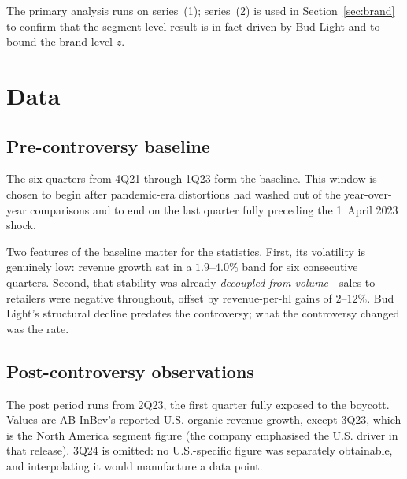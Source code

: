 \documentclass[11pt,a4paper]{article}
\begin{document}
The primary analysis runs on series~(1); series~(2) is used in
Section~\ref{sec:brand} to confirm that the segment-level result is in fact
driven by Bud Light and to bound the brand-level $z$.

\section{Data}

\subsection{Pre-controversy baseline}

The six quarters from 4Q21 through 1Q23 form the baseline. This window is
chosen to begin after pandemic-era distortions had washed out of the
year-over-year comparisons and to end on the last quarter fully preceding the
1~April 2023 shock.

\begin{table}[h]
\centering
\caption{Pre-controversy baseline: AB InBev U.S. quarterly performance. Revenue
growth is remarkably stable---a mean of \baseMu\% with a standard deviation of
only \baseSd\ percentage points---because price and mix were carrying the
business while volumes drifted gently down.}
\vspace{2pt}
\BaselineTable
\end{table}

Two features of the baseline matter for the statistics. First, its volatility
is genuinely low: revenue growth sat in a $1.9$--$4.0\%$ band for six
consecutive quarters. Second, that stability was already \emph{decoupled from
volume}---sales-to-retailers were negative throughout, offset by revenue-per-hl
gains of $2$--$12\%$. Bud Light's structural decline predates the controversy;
what the controversy changed was the rate.

\subsection{Post-controversy observations}

The post period runs from 2Q23, the first quarter fully exposed to the
boycott. Values are AB InBev's reported U.S. organic revenue growth, except
3Q23, which is the North America segment figure (the company emphasised the
U.S. driver in that release). 3Q24 is omitted: no U.S.-specific figure was
separately obtainable, and interpolating it would manufacture a data point.
\end{document}
